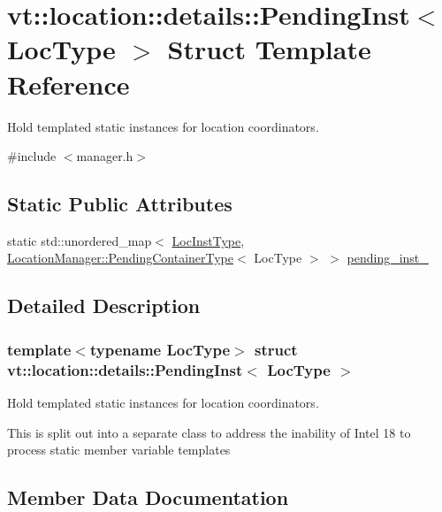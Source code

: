 \hypertarget{structvt_1_1location_1_1details_1_1_pending_inst}{}\section{vt\+:\+:location\+:\+:details\+:\+:Pending\+Inst$<$ Loc\+Type $>$ Struct Template Reference}
\label{structvt_1_1location_1_1details_1_1_pending_inst}


Hold templated static instances for location coordinators.  




{\ttfamily \#include $<$manager.\+h$>$}

\subsection*{Static Public Attributes}
\begin{DoxyCompactItemize}
\item 
static std\+::unordered\+\_\+map$<$ \hyperlink{namespacevt_1_1location_a4db6456e8024af2d23fc5ae560fef866}{Loc\+Inst\+Type}, \hyperlink{structvt_1_1location_1_1_location_manager_aad005a828c535232cd6b63859b25b171}{Location\+Manager\+::\+Pending\+Container\+Type}$<$ Loc\+Type $>$ $>$ \hyperlink{structvt_1_1location_1_1details_1_1_pending_inst_ada747cad12a1705e6a7759d0e2b08476}{pending\+\_\+inst\+\_\+}
\end{DoxyCompactItemize}


\subsection{Detailed Description}
\subsubsection*{template$<$typename Loc\+Type$>$\newline
struct vt\+::location\+::details\+::\+Pending\+Inst$<$ Loc\+Type $>$}

Hold templated static instances for location coordinators. 

This is split out into a separate class to address the inability of Intel 18 to process static member variable templates 

\subsection{Member Data Documentation}
\mbox{\label{structvt_1_1location_1_1details_1_1_pending_inst_ada747cad12a1705e6a7759d0e2b08476}} 
